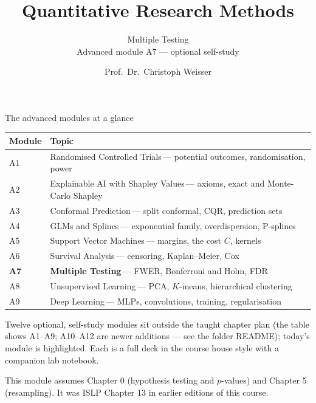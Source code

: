 \documentclass[aspectratio=169,11pt]{beamer}
\title{Quantitative Research Methods}
\subtitle{Multiple Testing\\[2pt]{\small Advanced module A7 --- optional self-study}}
\author{Prof.\ Dr.\ Christoph Weisser}
\date{}\graphicspath{{images/}}
\begin{document}
\begin{frame}[plain]\titlepage\end{frame}

\begin{frame}{The advanced modules at a glance}
  \vspace{-1.5mm}
  \begin{center}
  \scriptsize
  \setlength{\tabcolsep}{5pt}
  \renewcommand{\arraystretch}{1.30}
  \begin{tabular}{@{\hspace{2pt}}l >{\raggedright\arraybackslash}p{}@{\hspace{2pt}}}
    \toprule
    \textbf{Module} & \textbf{Topic} \\
    \midrule
     {\color{accent}A1} & Randomised Controlled Trials\,{\color{black!45}--- potential outcomes, randomisation, power} \\
    \rowcolor{black!3} {\color{accent}A2} & Explainable AI with Shapley Values\,{\color{black!45}--- axioms, exact and Monte-Carlo Shapley} \\
     {\color{accent}A3} & Conformal Prediction\,{\color{black!45}--- split conformal, CQR, prediction sets} \\
    \rowcolor{black!3} {\color{accent}A4} & GLMs and Splines\,{\color{black!45}--- exponential family, overdispersion, P-splines} \\
     {\color{accent}A5} & Support Vector Machines\,{\color{black!45}--- margins, the cost $C$, kernels} \\
    \rowcolor{black!3} {\color{accent}A6} & Survival Analysis\,{\color{black!45}--- censoring, Kaplan--Meier, Cox} \\
    \rowcolor{accent!18} \textbf{A7} & \textbf{Multiple Testing}\,{\color{accent!75!black}--- FWER, Bonferroni and Holm, FDR} \\
     {\color{accent}A8} & Unsupervised Learning\,{\color{black!45}--- PCA, $K$-means, hierarchical clustering} \\
    \rowcolor{black!3} {\color{accent}A9} & Deep Learning\,{\color{black!45}--- MLPs, convolutions, training, regularisation} \\
    \bottomrule
  \end{tabular}
  \end{center}
  \vspace{2mm}
  {\scriptsize Twelve optional, self-study modules sit outside the taught
  chapter plan (the table shows A1--A9; A10--A12 are newer additions --- see the folder README); today's module is highlighted. Each is a full deck in the course
  house style with a companion lab notebook.\par\medskip This module assumes Chapter 0 (hypothesis testing and $p$-values) and Chapter 5 (resampling). It was ISLP Chapter 13 in earlier editions of this course.}
\end{frame}
\end{document}
